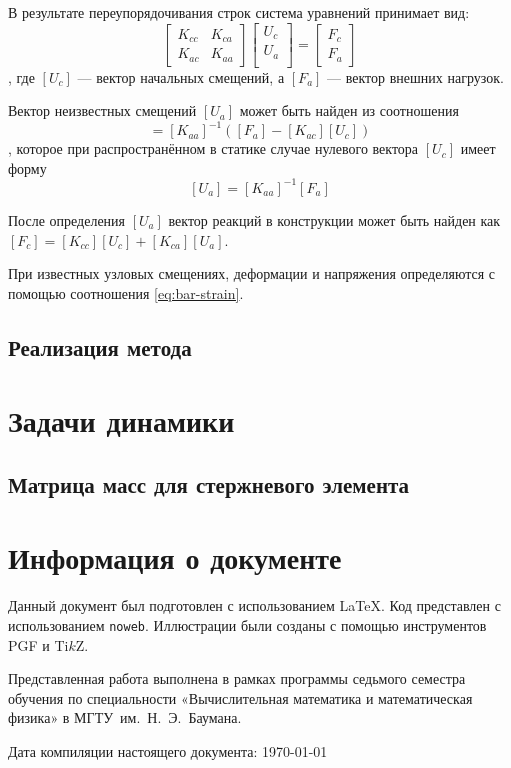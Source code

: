 \documentclass[10pt]{article}
\numberwithin{equation}{section}
\newcommand{\program}[1]{{\tt #1}}
\newcommand{\matr}[1]{[#1]}
\begin{document}
В результате переупорядочивания строк система уравнений принимает вид:
\begin{equation*}
  \label{eq:system-partitioned}
  \begin{bmatrix}
    K_{cc}& K_{ca} \\
    K_{ac}& K_{aa}
  \end{bmatrix}
  \begin{bmatrix}
    U_c\\
    U_a\\
  \end{bmatrix}
  =
  \begin{bmatrix}
    F_c\\
    F_a
  \end{bmatrix}
\end{equation*},
где $\matr{U_c}$ — вектор начальных смещений, а $\matr{F_a}$ — вектор
внешних нагрузок.

Вектор неизвестных смещений $\matr{U_a}$ может быть найден из соотношения
\begin{equation}
  \matr{U_a} = \matr{K_{aa}}^{-1}(\matr{F_a} - \matr{K_{ac}}\matr{U_c})
\end{equation},
которое при распространённом в статике случае нулевого вектора
$\matr{U_c}$ имеет форму
\begin{equation}
  \label{eq:displacements}
  \matr{U_a} = \matr{K_{aa}}^{-1}\matr{F_a}
\end{equation}

После определения $\matr{U_a}$ вектор реакций в конструкции может быть
найден как $\matr{F_c} = \matr{K_{cc}}\matr{U_c} +
\matr{K_{ca}}\matr{U_a}$.

При известных узловых смещениях, деформации и напряжения определяются
с помощью соотношения \eqref{eq:bar-strain}.

\subsection{Реализация метода}

\section{Задачи динамики}

\subsection{Матрица масс для стержневого элемента}

\clearpage
\appendix
\section{Информация о документе}

Данный документ был подготовлен с использованием \LaTeX{}. Код
представлен с использованием \program{noweb}. Иллюстрации были созданы
с помощью инструментов PGF и Ti$k$Z.

Представленная работа выполнена в рамках программы седьмого семестра
обучения по специальности «Вычислительная математика и математическая
физика» в МГТУ им. Н. Э. Баумана.

Дата компиляции настоящего документа: \today



\end{document}
